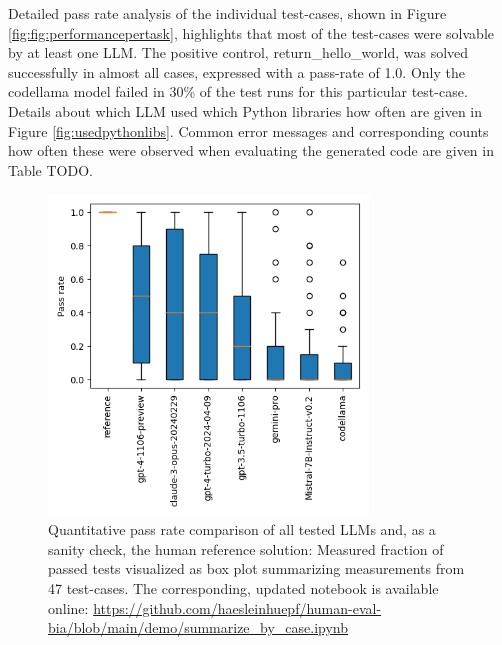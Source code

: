 \documentclass{ecai}
\begin{document}
Detailed pass rate analysis of the individual test-cases, shown in Figure \ref{fig:fig:performancepertask}, highlights that most of the test-cases were solvable by at least one LLM. The positive control, return\_hello\_world, was solved successfully in almost all cases, expressed with a pass-rate of 1.0. Only the codellama model failed in 30\% of the test runs for this particular test-case. Details about which LLM used which Python libraries how often are given in Figure \ref{fig:usedpythonlibs}. Common error messages and corresponding counts how often these were observed when evaluating the generated code are given in Table  TODO.


\begin{figure}[h]
\centering
\includegraphics[width=8.5cm]{pass_rate_llms.png}
\caption{Quantitative pass rate comparison of all tested LLMs and, as a sanity check, the human reference solution: Measured fraction of passed tests visualized as box plot summarizing measurements from 47 test-cases. The corresponding, updated notebook is available online: 
\url{https://github.com/haesleinhuepf/human-eval-bia/blob/main/demo/summarize_by_case.ipynb}
\newline
\newline
}
\label{fig:passratellms}
\end{figure}
\end{document}
